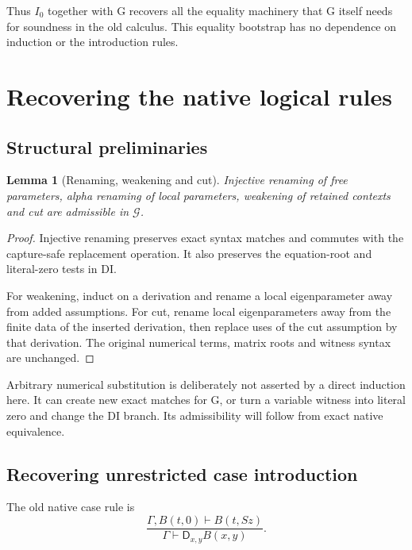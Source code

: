\documentclass[11pt,letterpaper]{article}
\newtheorem{lemma}[theorem]{Lemma}
\theoremstyle{definition}
\theoremstyle{remark}
\newcommand{\D}{\mathsf D}
\newcommand{\Gcal}{\mathcal G}
\begin{document}
Thus $I_0$ together with G recovers all the equality machinery that G
itself needs for soundness in the old calculus. This equality bootstrap
has no dependence on induction or the introduction rules.

\section{Recovering the native logical rules}
\label{new:intro}

\subsection{Structural preliminaries}

\begin{lemma}[Renaming, weakening and cut]\label{new:struct}
Injective renaming of free parameters, alpha renaming of local parameters,
weakening of retained contexts and cut are admissible in $\Gcal$.
\end{lemma}
\begin{proof}
Injective renaming preserves exact syntax matches and commutes with the
capture-safe replacement operation. It also preserves the equation-root
and literal-zero tests in DI.

For weakening, induct on a derivation and rename a local eigenparameter
away from added assumptions. For cut, rename local eigenparameters away
from the finite data of the inserted derivation, then replace uses of
the cut assumption by that derivation. The original numerical terms,
matrix roots and witness syntax are unchanged.
\end{proof}

Arbitrary numerical substitution is deliberately not asserted by a direct
induction here. It can create new exact matches for G, or turn a variable
witness into literal zero and change the DI branch. Its admissibility
will follow from exact native equivalence.

\subsection{Recovering unrestricted case introduction}

The old native case rule is
\[
 \frac{\Gamma,B(t,0)\vdash B(t,Sz)}
      {\Gamma\vdash\D_{x,y}B(x,y)}. \tag{DI-case}
\]
\end{document}
